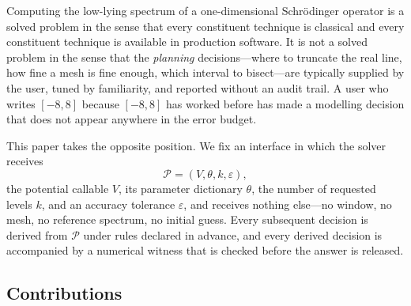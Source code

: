 \documentclass[twocolumn,10pt,a4paper]{article}
\theoremstyle{plain}
\theoremstyle{definition}
\newcommand{\eps}{\varepsilon}
\begin{document}
Computing the low-lying spectrum of a one-dimensional Schr\"odinger operator is
a solved problem in the sense that every constituent technique is classical and
every constituent technique is available in production software. It is not a
solved problem in the sense that the \emph{planning} decisions---where to
truncate the real line, how fine a mesh is fine enough, which interval to
bisect---are typically supplied by the user, tuned by familiarity, and reported
without an audit trail. A user who writes $[-8,8]$ because $[-8,8]$ has worked
before has made a modelling decision that does not appear anywhere in the error
budget.

This paper takes the opposite position. We fix an interface in which the solver
receives
\begin{equation}
\mathcal{P} = (V,\theta,k,\eps),
\end{equation}
the potential callable $V$, its parameter dictionary $\theta$, the number of
requested levels $k$, and an accuracy tolerance $\eps$, and receives nothing
else---no window, no mesh, no reference spectrum, no initial guess. Every
subsequent decision is derived from $\mathcal{P}$ under rules declared in
advance, and every derived decision is accompanied by a numerical witness that
is checked before the answer is released.

\subsection{Contributions}
\end{document}
